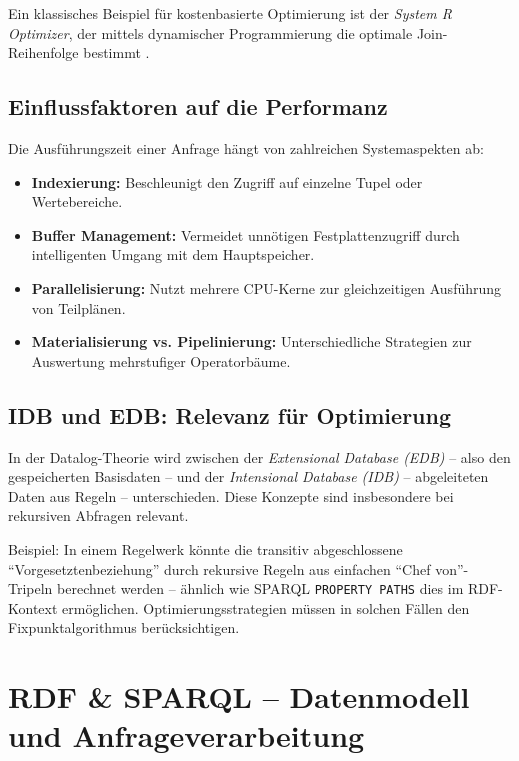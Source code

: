 \documentclass[12pt]{article}
\begin{document}
Ein klassisches Beispiel für kostenbasierte Optimierung ist der \emph{System R Optimizer}, der mittels dynamischer Programmierung die optimale Join-Reihenfolge bestimmt \cite{selinger1979access}.

\subsection{Einflussfaktoren auf die Performanz}

Die Ausführungszeit einer Anfrage hängt von zahlreichen Systemaspekten ab:

\begin{itemize}
    \item \textbf{Indexierung:} Beschleunigt den Zugriff auf einzelne Tupel oder Wertebereiche.
    \item \textbf{Buffer Management:} Vermeidet unnötigen Festplattenzugriff durch intelligenten Umgang mit dem Hauptspeicher.
    \item \textbf{Parallelisierung:} Nutzt mehrere CPU-Kerne zur gleichzeitigen Ausführung von Teilplänen.
    \item \textbf{Materialisierung vs. Pipelinierung:} Unterschiedliche Strategien zur Auswertung mehrstufiger Operatorbäume.
\end{itemize}

\subsection{IDB und EDB: Relevanz für Optimierung}

In der Datalog-Theorie wird zwischen der \emph{Extensional Database (EDB)} – also den gespeicherten Basisdaten – und der \emph{Intensional Database (IDB)} – abgeleiteten Daten aus Regeln – unterschieden. Diese Konzepte sind insbesondere bei rekursiven Abfragen relevant.

Beispiel: In einem Regelwerk könnte die transitiv abgeschlossene ``Vorgesetztenbeziehung'' durch rekursive Regeln aus einfachen ``Chef von''-Tripeln berechnet werden – ähnlich wie SPARQL \texttt{PROPERTY PATHS} dies im RDF-Kontext ermöglichen. Optimierungsstrategien müssen in solchen Fällen den Fixpunktalgorithmus berücksichtigen.

\section{RDF \& SPARQL – Datenmodell und Anfrageverarbeitung} \label{sec:rdf}
\end{document}
